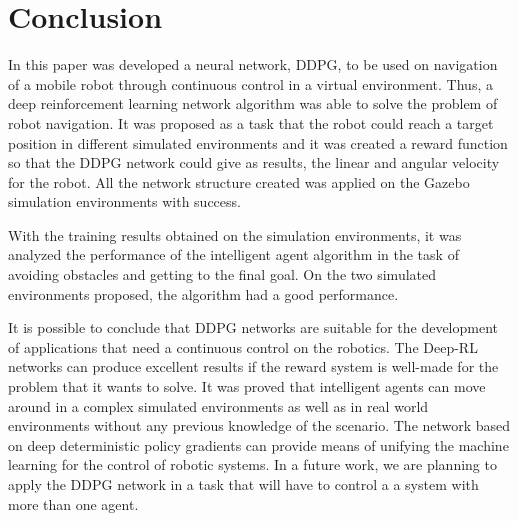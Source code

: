 \section*{Conclusion}

In this paper was developed a neural network, DDPG, to be used on navigation of a mobile robot through continuous control in a virtual environment.
Thus, a deep reinforcement learning network algorithm was able to solve the problem of robot navigation.
It was proposed as a task that the robot could reach a target position in different simulated environments and it was created a reward function so that the DDPG network could give as results, the linear and angular velocity for the robot. All the network structure created was applied on the Gazebo simulation environments with success.

With the training results obtained on the simulation environments, it was analyzed the performance of the intelligent agent algorithm in the task of avoiding obstacles and getting to the final goal. 
On the two simulated environments proposed, the algorithm had a good performance.

It is possible to conclude that DDPG networks are suitable for the development of applications that need a continuous control on the robotics.
The Deep-RL networks can produce excellent results if the reward system is well-made for the problem that it wants to solve.
It was proved that intelligent agents can move around in a complex simulated environments as well as in real world environments without any previous knowledge of the scenario.
The network based on deep deterministic policy gradients can provide means of unifying the machine learning for the control of robotic systems.
In a future work, we are planning to apply the DDPG network in a task that will have to control a a system with more than one agent.

